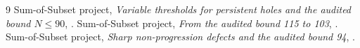 \documentclass[11pt,a4paper]{article}
\begin{document}
\begingroup\small
\begin{thebibliography}{9}\setlength{\itemsep}{1pt}
 Sum-of-Subset project,
\emph{Variable thresholds for persistent holes and the audited bound
$N\le90$}, .
 Sum-of-Subset project,
\emph{From the audited bound 115 to 103},
.
 Sum-of-Subset project,
\emph{Sharp non-progression defects and the audited bound 94},
.
\end{thebibliography}
\endgroup
\end{document}
